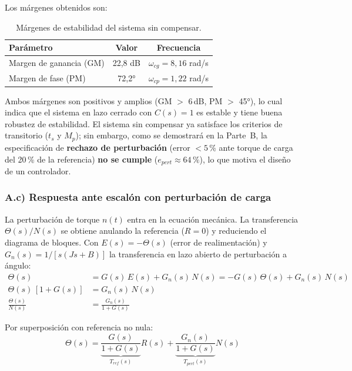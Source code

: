 \documentclass[12pt, a4paper]{article}
\begin{document}
Los márgenes obtenidos son:
%
\begin{table}[H]
\centering
\caption{Márgenes de estabilidad del sistema sin compensar.}
\begin{tabular}{@{}lcc@{}}
\toprule
\textbf{Parámetro} & \textbf{Valor} & \textbf{Frecuencia} \\
\midrule
Margen de ganancia (GM) & 22,8 dB & $\omega_{cg} = 8{,}16$ rad/s \\
Margen de fase (PM)     & 72,2°   & $\omega_{cp} = 1{,}22$ rad/s \\
\bottomrule
\end{tabular}
\end{table}

Ambos márgenes son positivos y amplios (GM $>$ 6\,dB, PM $>$ 45°), lo cual indica que el sistema en lazo cerrado con $C(s)=1$ es estable y tiene buena robustez de estabilidad. El sistema sin compensar ya satisface los criterios de transitorio ($t_s$ y $M_p$); sin embargo, como se demostrará en la Parte~B, la especificación de \textbf{rechazo de perturbación} (error $< 5\,\%$ ante torque de carga del 20\,\% de la referencia) \textbf{no se cumple} ($e_{pert} \approx 64\,\%$), lo que motiva el diseño de un controlador.

\subsubsection{A.c) Respuesta ante escalón con perturbación de carga}

La perturbación de torque $n(t)$ entra en la ecuación mecánica. La transferencia $\Theta(s)/N(s)$ se obtiene anulando la referencia ($R = 0$) y reduciendo el diagrama de bloques. Con $E(s) = -\Theta(s)$ (error de realimentación) y $G_n(s) = 1/[s(Js+B)]$ la transferencia en lazo abierto de perturbación a ángulo:
%
\begin{align}
    \Theta(s) &= G(s)\,E(s) + G_n(s)\,N(s) = -G(s)\,\Theta(s) + G_n(s)\,N(s) \nonumber\\
    \Theta(s)\,[1 + G(s)] &= G_n(s)\,N(s) \nonumber\\
    \frac{\Theta(s)}{N(s)} &= \frac{G_n(s)}{1+G(s)} \label{eq:Tpert}
\end{align}

Por superposición con referencia no nula:
%
\begin{equation}
    \Theta(s) = \underbrace{\frac{G(s)}{1+G(s)}}_{T_{ref}(s)} R(s)
    + \underbrace{\frac{G_n(s)}{1+G(s)}}_{T_{pert}(s)} N(s)
\end{equation}
\end{document}
